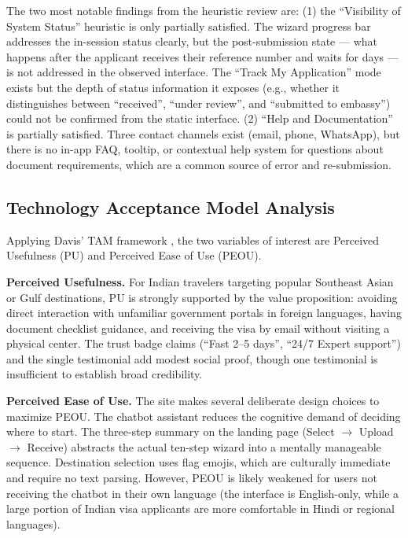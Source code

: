 \documentclass[journal, 10pt, twoside]{IEEEtran}
\begin{document}
The two most notable findings from the heuristic review are: (1) the
``Visibility of System Status'' heuristic is only partially satisfied.
The wizard progress bar addresses the in-session status clearly, but
the post-submission state --- what happens after the applicant receives
their reference number and waits for days --- is not addressed in the
observed interface. The ``Track My Application'' mode exists but the
depth of status information it exposes (e.g., whether it distinguishes
between ``received'', ``under review'', and ``submitted to embassy'')
could not be confirmed from the static interface. (2) ``Help and
Documentation'' is partially satisfied. Three contact channels exist
(email, phone, WhatsApp), but there is no in-app FAQ, tooltip, or
contextual help system for questions about document requirements,
which are a common source of error and re-submission.

\subsection{Technology Acceptance Model Analysis}
\label{subsec:tam}
Applying Davis' TAM framework \cite{davis1989}, the two variables of
interest are Perceived Usefulness (PU) and Perceived Ease of Use (PEOU).

\textbf{Perceived Usefulness.} For Indian travelers targeting popular
Southeast Asian or Gulf destinations, PU is strongly supported by the
value proposition: avoiding direct interaction with unfamiliar government
portals in foreign languages, having document checklist guidance, and
receiving the visa by email without visiting a physical center. The trust
badge claims (``Fast 2--5 days'', ``24/7 Expert support'') and the single
testimonial add modest social proof, though one testimonial is insufficient
to establish broad credibility.

\textbf{Perceived Ease of Use.} The site makes several deliberate design
choices to maximize PEOU. The chatbot assistant reduces the cognitive demand
of deciding where to start. The three-step summary on the landing page
(Select $\rightarrow$ Upload $\rightarrow$ Receive) abstracts the actual
ten-step wizard into a mentally manageable sequence. Destination selection
uses flag emojis, which are culturally immediate and require no text
parsing. However, PEOU is likely weakened for users not receiving the
chatbot in their own language (the interface is English-only, while a
large portion of Indian visa applicants are more comfortable in Hindi
or regional languages).
\end{document}
